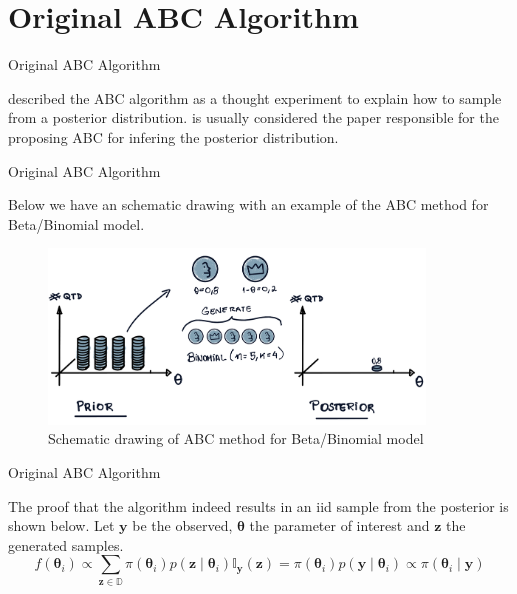 \documentclass[10pt]{beamer}
\begin{document}
\AtBeginSection{}
\section[Original]{Original ABC Algorithm}
\begin{frame}[fragile]{Original ABC Algorithm}

  \citet{Rubin1984} described the ABC algorithm as a thought experiment
  to explain how to sample from a posterior distribution.
  \citet{Tavare505} is usually considered the paper responsible for the
  proposing ABC for infering the posterior distribution.

  \vspace{1cm}

\begin{algorithm}[H]
\SetAlgoLined
{}
 \caption{Original ABC method}
\end{algorithm}


\end{frame}

\begin{frame}[fragile]{Original ABC Algorithm}

  Below we have an schematic drawing with an example of
  the ABC method for Beta/Binomial model.
    \begin{figure}[H]
        \centering
        \includegraphics[width=10cm]{images/Vis-ABC.png}
        \caption{Schematic drawing of ABC method for Beta/Binomial
        model}
    \end{figure}

\end{frame}

\begin{frame}[fragile]{Original ABC Algorithm}

  The proof that the algorithm indeed results in an iid sample
  from the posterior is shown below. Let $\bm y$ be the observed,
  $\bm \theta$ the parameter of interest and $\bm z$ the generated
  samples.
  $$
  f(\bm \theta_i) \propto \sum_{\bm z \in \mathbb{D}}
  \pi(\bm \theta_i) p(\bm z \mid \bm \theta_i) \mathbb I_{\bm y}(\bm z)
  = \pi(\bm \theta_i) p(\bm y \mid \bm \theta_i) \propto
  \pi(\bm \theta_i \mid \bm y)
  $$

\end{frame}
\end{document}
